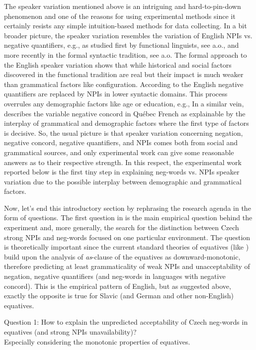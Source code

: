 \noindent The speaker variation mentioned above is an intriguing and hard-to-pin-down phenomenon and one of the reasons for using experimental methods since it certainly resists any simple intuition-based methods for data collecting. In a bit broader picture, the speaker variation resembles the variation of English NPIs vs. negative quantifiers, e.g., as studied first by functional linguists, see \citet{tottie1991negation} a.o., and more recently in the formal syntactic tradition, see \citet{burnett2015variable,burnett2018structural} a.o. The formal approach to the English speaker variation shows that while historical and social factors discovered in the functional tradition are real but their impact is much weaker than grammatical factors like configuration. According to \cite{burnett2018structural} the English negative quantifiers are replaced by NPIs in lower syntactic domains. This process overrules any demographic factors like age or education, e.g., In a similar vein, \cite{burnett2015variable} describes the variable negative concord in Québec French as explainable by the interplay of grammatical and demographic factors where the first type of factors is decisive. So, the usual picture is that speaker variation concerning negation, negative concord, negative quantifiers, and NPIs comes both from social and grammatical sources, and only experimental work can give some reasonable answers as to their respective strength. In this respect, the experimental work reported below is the first tiny step in explaining neg-words vs. NPIs speaker variation due to the possible interplay between demographic and grammatical factors.

Now, let's end this introductory section by rephrasing the research agenda in the form of questions. The first question in  is the main empirical question behind the experiment and, more generally, the search for the distinction between Czech strong NPIs and neg-words focused on one particular environment. The question is theoretically important since the current standard theories of equatives (like \cite{stechow1984comparing,beck201913}) build upon the analysis of \textit{as}-clause of the equatives as downward-monotonic, therefore predicting at least grammaticality of weak NPIs and unacceptability of negation, negative quantifiers (and neg-words in languages with negative concord). This is the empirical pattern of English, but as suggested above, exactly the opposite is true for Slavic (and German and other non-English) equatives.

\ea\label{ex-6} Question 1: How to explain the unpredicted acceptability of Czech
neg-words in equatives (and strong NPIs unavailability)?\\
\ea Especially considering the monotonic properties of equatives.
\z\z

